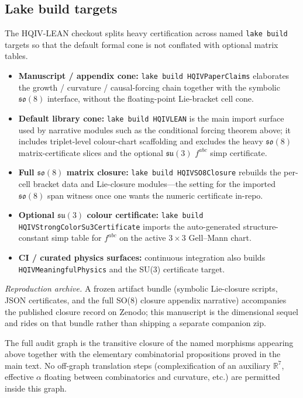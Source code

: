 \documentclass[11pt]{amsart}
\begin{document}
\subsection{Lake build targets}
\label{subsec:lake-targets}

The HQIV-LEAN checkout splits heavy certification across named \texttt{lake build} targets so that the default formal cone is not conflated with optional matrix tables.
\begingroup
\sloppy
\setlength{\emergencystretch}{4em}
\begin{itemize}
  \item \textbf{Manuscript / appendix cone:} \texttt{lake build HQIVPaperClaims} elaborates the growth / curvature / causal-forcing chain together with the symbolic \(\mathfrak{so}(8)\) interface, without the floating-point Lie-bracket cell cone.
  \item \textbf{Default library cone:} \texttt{lake build HQIVLEAN} is the main import surface used by narrative modules such as the conditional forcing theorem above; it includes triplet-level colour-chart scaffolding and excludes the heavy \(\mathfrak{so}(8)\) matrix-certificate slices and the optional \(\mathfrak{su}(3)\) \(f^{abc}\) simp certificate.
  \item \textbf{Full \(\mathfrak{so}(8)\) matrix closure:} \texttt{lake build HQIVSO8Closure} rebuilds the per-cell bracket data and Lie-closure modules---the setting for the imported \(\mathfrak{so}(8)\) span witness once one wants the numeric certificate in-repo.
  \item \textbf{Optional \(\mathfrak{su}(3)\) colour certificate:} \texttt{lake build HQIVStrongColorSu3Certificate} imports the auto-generated structure-constant simp table for \(f^{abc}\) on the active \(3\times 3\) Gell--Mann chart.
  \item \textbf{CI / curated physics surfaces:} continuous integration also builds \texttt{HQIVMeaningfulPhysics} and the SU(3) certificate target.
\end{itemize}
\endgroup

\medskip
\noindent\textit{Reproduction archive.} A frozen artifact bundle (symbolic Lie-closure scripts, JSON certificates, and the full SO(8) closure appendix narrative) accompanies the published closure record \cite{hqiv-so8-paper} on Zenodo; this manuscript is the dimensional sequel and rides on that bundle rather than shipping a separate companion zip.

The full audit graph is the transitive closure of the named morphisms appearing above together with the elementary combinatorial propositions proved in the main text. No off-graph translation steps (complexification of an auxiliary \(\mathbb{R}^7\), effective \(\alpha\) floating between combinatorics and curvature, etc.) are permitted inside this graph.
\end{document}
